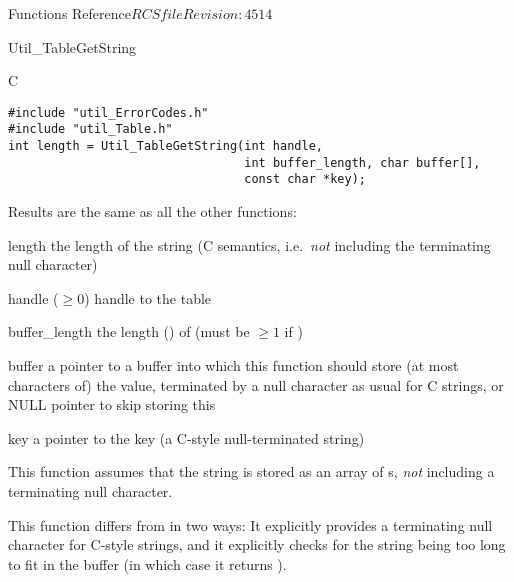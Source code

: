 \begin{cactuspart}{ Functions Reference}{$RCSfile$}{$Revision: 4514 $}
\begin{FunctionDescription}{Util\_TableGetString}
\begin{SynopsisSection}
\begin{Synopsis}{C}
\begin{verbatim}
#include "util_ErrorCodes.h"
#include "util_Table.h"
int length = Util_TableGetString(int handle,
                                 int buffer_length, char buffer[],
                                 const char *key);
\end{verbatim}
\end{Synopsis}
\end{SynopsisSection}

\begin{ResultSection}
\begin{ResultNote}
Results are the same as all the other  functions:
\end{ResultNote}
\begin{Result}{length}
the length of the string
(C  semantics, i.e.\ {\em not\/} including
the terminating null character)
\end{Result}
\end{ResultSection}

\begin{ParameterSection}
\begin{Parameter}{handle ($\ge 0$)}
handle to the table
\end{Parameter}
\begin{Parameter}{buffer\_length}
the length () of 
(must be $\ge 1$ if )
\end{Parameter}
\begin{Parameter}{buffer}
a pointer to a buffer into which this function should store
(at most   characters of) the value,
terminated by a null character as usual for C strings,
or NULL pointer to skip storing this
\end{Parameter}
\begin{Parameter}{key}
a pointer to the key (a C-style null-terminated string)
\end{Parameter}
\end{ParameterSection}

\begin{Discussion}
This function assumes that the string is stored as an array of
s, {\em not\/} including a terminating null character.

This function differs from  in two ways:
It explicitly provides a terminating null character for C-style strings,
and it explicitly checks for the string being too long to fit in the buffer
(in which case it returns ).


\end{Discussion}
\end{FunctionDescription}
\end{cactuspart}
